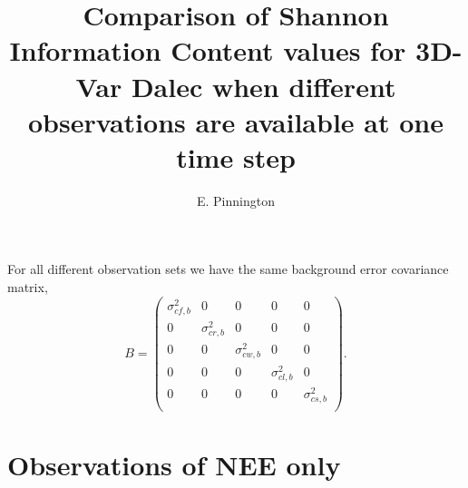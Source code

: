 \documentclass[11pt]{article}
\title{Comparison of Shannon Information Content values for 3D-Var Dalec when different observations are available at one time step}
\author{E. Pinnington}
\begin{document}
\maketitle

For all different observation sets we have the same background error covariance matrix,
\[
B = \begin{pmatrix} 
\sigma_{cf,b}^{2} & 0 & 0 & 0 & 0 \\
0 & \sigma_{cr,b}^{2} & 0 & 0 & 0 \\
0 & 0 & \sigma_{cw,b}^{2} & 0 & 0 \\
0 & 0 & 0 & \sigma_{cl,b}^{2} & 0 \\
0 & 0 & 0 & 0 & \sigma_{cs,b}^{2} \\
\end{pmatrix}.
\]

\section*{Observations of NEE only}
	
\end{document}
